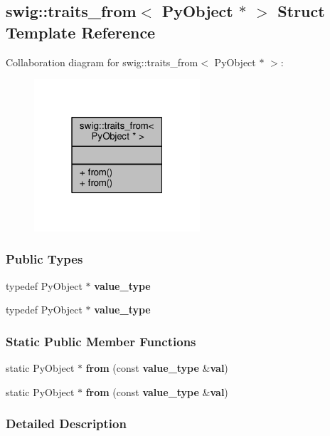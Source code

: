 \subsection{swig\+:\+:traits\+\_\+from$<$ Py\+Object $\ast$ $>$ Struct Template Reference}
\label{structswig_1_1traits__from_3_01PyObject_01_5_01_4}


Collaboration diagram for swig\+:\+:traits\+\_\+from$<$ Py\+Object $\ast$ $>$\+:
\nopagebreak
\begin{figure}[H]
\begin{center}
\leavevmode
\includegraphics[width=175pt]{d6/d6a/structswig_1_1traits__from_3_01PyObject_01_5_01_4__coll__graph}
\end{center}
\end{figure}
\subsubsection*{Public Types}
\begin{DoxyCompactItemize}
\item 
typedef Py\+Object $\ast$ {\bf value\+\_\+type}
\item 
typedef Py\+Object $\ast$ {\bf value\+\_\+type}
\end{DoxyCompactItemize}
\subsubsection*{Static Public Member Functions}
\begin{DoxyCompactItemize}
\item 
static Py\+Object $\ast$ {\bf from} (const {\bf value\+\_\+type} \&{\bf val})
\item 
static Py\+Object $\ast$ {\bf from} (const {\bf value\+\_\+type} \&{\bf val})
\end{DoxyCompactItemize}


\subsubsection{Detailed Description}
